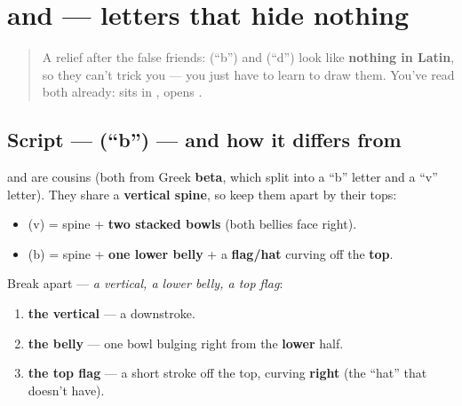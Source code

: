\section[\texorpdfstring{\ru{б}, \ru{д} (b, d)}{б, д (b, d)}]{ and  — letters that hide nothing}

\label{lesson:RU-W03-new-shapes-b-d}



\begin{quote}
A relief after the false friends: \textbf{} (\textquotedblleft{}b\textquotedblright{}) and \textbf{} (\textquotedblleft{}d\textquotedblright{}) look like \textbf{nothing in Latin}, so they can't trick you — you just have to learn to draw them. You've read both already: \emph{} sits in \emph{}, \emph{} opens \emph{}.
\end{quote}

\subsection*{Script —  (\textquotedblleft{}b\textquotedblright{}) — and how it differs from }

\textbf{} and \textbf{} are cousins (both from Greek \textbf{beta}, which split into a \textquotedblleft{}b\textquotedblright{} letter and a \textquotedblleft{}v\textquotedblright{} letter). They share a \textbf{vertical spine}, so keep them apart by their tops:

\begin{itemize}
\raggedright
  \item \textbf{} (v) = spine + \textbf{two stacked bowls} (both bellies face right).
  \item \textbf{} (b) = spine + \textbf{one lower belly} + a \textbf{flag/hat} curving off the \textbf{top}.
\end{itemize}

Break \textbf{} apart — \emph{a vertical, a lower belly, a top flag}:

\begin{enumerate}
\raggedright
  \item \textbf{the vertical} — a downstroke.
  \item \textbf{the belly} — one bowl bulging right from the \textbf{lower} half.
  \item \textbf{the top flag} — a short stroke off the top, curving \textbf{right} (the \textquotedblleft{}hat\textquotedblright{} that  doesn't have).
\end{enumerate}

